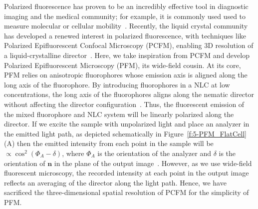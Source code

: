 Polarized fluorescence has proven to be an incredibly effective tool in diagnostic imaging and the medical community; for example, it is commonly used used to measure molecular or cellular mobility~\cite{RN282,RN284}.
Recently, the liquid crystal community has developed a renewed interest in polarized fluorescence, with techniques like Polarized Epifluorescent Confocal Microscopy (PCFM), enabling 3D resolution of a liquid-crystalline director~\cite{RN148,RN174}.
Here, we take inspiration from PCFM and develop Polarized Epifluorescent Microscopy (PFM), its wide-field cousin.
At its core, PFM relies on anisotropic fluorophores whose emission axis is aligned along the long axis of the fluorophore.
By introducing fluorophores in a NLC at low concentrations, the long axis of the fluorophores aligns along the nematic director without affecting the director configuration~\cite{RN148,RN174}.
Thus, the fluorescent emission of the mixed fluorophore and NLC system will be linearly polarized along the director.
If we excite the sample with unpolarized light and place an analyzer in the emitted light path, as depicted schematically in Figure~\ref{f:5-PFM_FlatCell}(A) then the emitted intensity from each point in the sample will be $\propto \cos^2{(\Phi_A-\delta)}$, where $\Phi_A$ is the orientation of the analyzer and $\delta$ is the orientation of $\mathbf{n}$ in the plane of the output image~\cite{RN174}.
However, as we use wide-field fluorescent microscopy, the recorded intensity at each point in the output image reflects an averaging of the director along the light path.
Hence, we have sacrificed the three-dimensional spatial resolution of PCFM for the simplicity of PFM.
